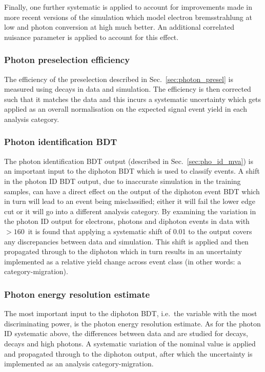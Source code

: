 Finally, one further systematic is applied to account for improvements made in more recent versions of the simulation which model electron bremsstrahlung at low \pT and photon conversion at high \pT much better. An additional correlated nuisance parameter is applied to account for this effect.

\subsubsection{Photon preselection efficiency}

The efficiency of the preselection described in Sec.~\ref{sec:photon_presel} is measured using \Zee decays in data and \MC simulation. The \MC efficiency is then corrected such that it matches the data and this incurs a systematic uncertainty which gets applied as an overall normalisation on the expected signal event yield in each analysis category. 

\subsubsection{Photon identification BDT}

The photon identification BDT output (described in Sec.~\ref{sec:pho_id_mva}) is an important input to the diphoton BDT which is used to classify events. A shift in the photon ID BDT output, due to inaccurate simulation in the training samples, can have a direct effect on the output of the diphoton event BDT which in turn will lead to an event being misclassified; either it will fail the lower edge cut or it will go into a different analysis category. By examining the variation in the photon ID output for \Zee electrons, \Zmumugamma photons and diphoton events in data with \mgg$>160$~\GeV it is found that applying a systematic shift of 0.01 to the output covers any discrepancies between data and \MC simulation. This shift is applied and then propagated through to the diphoton \BDT which in turn results in an uncertainty implemented as a relative yield change across event class (in other words: a category-migration).

\subsubsection{Photon energy resolution estimate}

The most important input to the diphoton BDT, i.e.\ the variable with the most discriminating power, is the photon energy resolution estimate. As for the photon ID systematic above, the differences between data and \MC are studied for \Zee decays, \Zmumugamma decays and high \pT photons. A systematic variation of the nominal value is applied and propagated through to the diphoton \BDT output, after which the uncertainty is implemented as an analysis category-migration.

